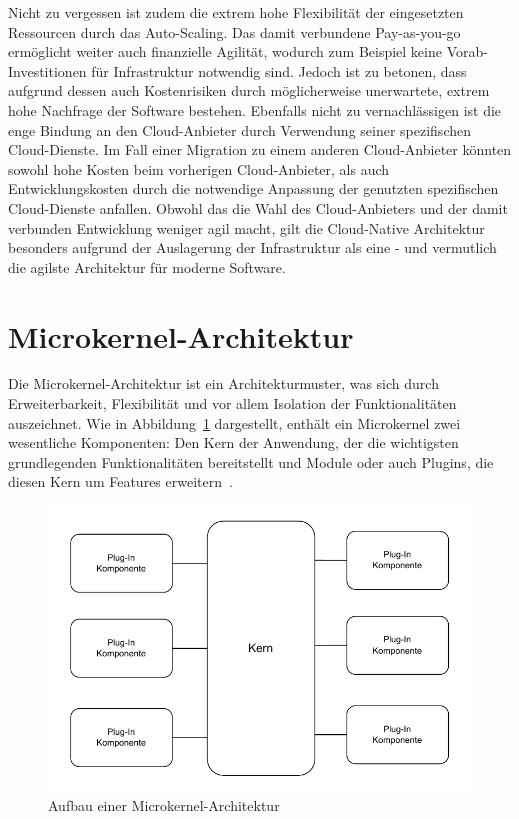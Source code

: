 \documentclass[acmtog]{acmart}
\begin{document}
Nicht zu vergessen ist zudem die extrem hohe Flexibilität der eingesetzten Ressourcen durch das Auto-Scaling.
Das damit verbundene Pay-as-you-go ermöglicht weiter auch finanzielle Agilität, wodurch zum Beispiel keine Vorab-Investitionen für Infrastruktur notwendig sind.
Jedoch ist zu betonen, dass aufgrund dessen auch Kostenrisiken durch möglicherweise unerwartete, extrem hohe Nachfrage der Software bestehen.
Ebenfalls nicht zu vernachlässigen ist die enge Bindung an den Cloud-Anbieter durch Verwendung seiner spezifischen Cloud-Dienste.
Im Fall einer Migration zu einem anderen Cloud-Anbieter könnten sowohl hohe Kosten beim vorherigen Cloud-Anbieter, als auch Entwicklungskosten durch die notwendige
Anpassung der genutzten spezifischen Cloud-Dienste anfallen.
Obwohl das die Wahl des Cloud-Anbieters und der damit verbunden Entwicklung weniger agil macht, gilt die Cloud-Native Architektur besonders aufgrund der Auslagerung
der Infrastruktur als eine - und vermutlich die agilste Architektur für moderne Software.

\section{Microkernel-Architektur}
\label{sec:microkernel}
Die Microkernel-Architektur ist ein Architekturmuster, was sich durch Erweiterbarkeit, Flexibilität und vor allem Isolation der Funktionalitäten auszeichnet.
Wie in Abbildung~\ref{fig:microkernel} dargestellt, enthält ein Microkernel zwei wesentliche Komponenten: Den Kern der Anwendung, der die wichtigsten grundlegenden Funktionalitäten bereitstellt und Module oder auch Plugins,
die diesen Kern um Features erweitern~\cite[21-22]{architecturePatterns}.

\begin{figure}[!h]
  \centering
  \includegraphics[width=\linewidth]{images/microkernel/microkernel}
  \caption{Aufbau einer Microkernel-Architektur}
  \label{fig:microkernel}
\end{figure}
\end{document}

